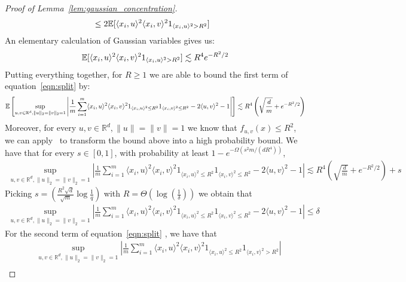 \begin{proof}[Proof of Lemma~\ref{lem:gaussian_concentration}]
\begin{align}
& \leq 2 \mathbb{E}[\langle x_i, u \rangle^2 \langle x_i , v \rangle^2 1_{\langle x_i,u  \rangle^2 > R^2 } ]\nonumber
 \end{align}
An elementary calculation of Gaussian variables gives us: 
\begin{align}
 \mathbb{E}[\langle x_i, u \rangle^2 \langle x_i , v \rangle^2 1_{\langle x_i,u  \rangle^2 > R^2 } ] \lesssim R^4 e^{- R^2/2}
\end{align}
\noindent Putting everything together, for $R \geq 1$ we are able to bound the first term of equation~\eqref{eqn:split} by:
{\small 
\begin{align}
\mathbb{E}\left[ \sup_{u, v \in \mathbb{R}^d, \| u \|_2=  \| v\|_2 = 1} \left| \frac{1}{m}\sum_{i = 1}^m\langle x_i, u \rangle^2 \langle x_i , v \rangle^2 1_{\langle x_i,u  \rangle^2 \leq R^2 } 1_{\langle x_i,v  \rangle^2 \leq R^2 } - 2 \langle u, v \rangle^2 - 1 \right|  \right]\lesssim R^4 \left( \sqrt{\frac{d}{m}}+ e^{- R^2 /2} \right) \label{eqn:211}
\end{align}}
Moreover, for every $u, v \in \mathbb{R}^d, \| u \|=  \| v\| = 1$ we know that $f_{u, v}(x)  \leq R^2$, we can apply~\cite[Lemma 4.8]{adamczak2010quantitative} to transform the bound above into a high probability bound. We have that for every $s \in [0, 1]$, with probability at least $1 - e^{-\Omega(s^2 m / (dR^4))}$, 
{\small 
\begin{align}
 \sup_{u, v \in \mathbb{R}^d, \| u \|_2=  \| v\|_2 = 1} \left| \frac{1}{m}\sum_{i = 1}^m\langle x_i, u \rangle^2 \langle x_i , v \rangle^2 1_{\langle x_i,u  \rangle^2 \leq R^2 } 1_{\langle x_i,v  \rangle^2 \leq R^2 } - 2 \langle u, v \rangle^2 - 1 \right| \lesssim R^4 \left( \sqrt{\frac{d}{m}}+ e^{- R^2 /2} \right) + s \nonumber
\end{align}
}
Picking $s = \left(\frac{R^2 \sqrt{d}}{\sqrt{m}} \log \frac{1}{q}  \right)$ with $R =  \Theta \left(\log\left(\frac{1}{ \delta}\right) \right)$ we obtain that 
\begin{align}
\sup_{u, v \in \mathbb{R}^d, \| u \|_2=  \| v\|_2 = 1} \left| \frac{1}{m}\sum_{i = 1}^m\langle x_i, u \rangle^2 \langle x_i , v \rangle^2 1_{\langle x_i,u  \rangle^2 \leq R^2 } 1_{\langle x_i,v  \rangle^2 \leq R^2 } - 2 \langle u, v \rangle^2 - 1 \right| \leq \delta\nonumber
\end{align}
For the second term of equation~\eqref{eqn:split} , we have that 
\begin{align}
& \sup_{u, v \in \mathbb{R}^d, \| u \|_2=  \| v\|_2 = 1} \left| \frac{1}{m}\sum_{i = 1}^m \langle x_i, u \rangle^2 \langle x_i , v \rangle^2   1_{\langle x_i,u  \rangle^2 \leq R^2} 1_{\langle x_i,v  \rangle^2 > R^2 }  \right|\nonumber \\

\end{align}
\end{proof}
